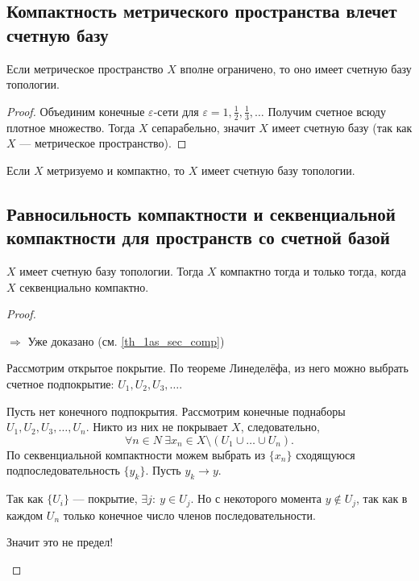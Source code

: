 \documentclass[11pt]{book}
\theoremstyle{definition}
\theoremstyle{plain}
\theoremstyle{plain}
\theoremstyle{definition}
\theoremstyle{remark}
\begin{document}
\subsection{Компактность метрического пространства влечет счетную базу}
\begin{thm}
    Если метрическое пространство $ X$ вполне ограничено, то оно имеет счетную базу топологии.
\end{thm}
\begin{proof}
    Объединим конечные $ \varepsilon $-сети для  $ \varepsilon = 1, \frac{1}{2}, \frac{1}{3}, \ldots $
    Получим счетное всюду плотное множество. Тогда  $ X$ сепарабельно, значит  $ X$ имеет счетную базу (так как  $ X$ --- метрическое пространство).
\end{proof}
\begin{thm}
    Если $ X$ метризуемо и компактно, то  $ X$ имеет счетную базу топологии.
\end{thm}
\subsection{Равносильность компактности и секвенциальной компактности для пространств со счетной базой}
\begin{thm}
    $ X$ имеет счетную базу топологии. Тогда   $ X$ компактно  тогда и только тогда, когда $ X$ секвенциально компактно.
\end{thm}
\begin{proof}
    $ $
    \begin{description}
	\item $\boxed{ \Longrightarrow }$  Уже доказано (см. \ref{th_1as_sec_comp})
	\item \boxed{ \Longleftarrow } Рассмотрим открытое покрытие. По теореме Линеделёфа, из него можно выбрать счетное подпокрытие: $ U_1, U_2, U_3, \ldots $.

	    Пусть нет конечного подпокрытия.
	    Рассмотрим конечные поднаборы $ U_1, U_2, U_3, \ldots , U_n$. Никто из них не покрывает $ X$, следовательно,
	    \[
		\forall n \in N~ \exists x_n \in X \setminus (U_1 \cup \ldots \cup U_n)
	    .\]
	    По секвенциальной компактности можем выбрать из $ \{x_{n}\}$ сходящуюся подпоследовательность $ \{y_k\}$. Пусть $ y_k \to  y$.

	    Так как $ \{U_i\}$ --- покрытие, $ \exists j: ~ y \in U_j $. Но с некоторого момента $ y \not\in U_j$, так как в каждом $ U_n$ только конечное число членов последовательности.

	    Значит это не предел!
    \end{description}
\end{proof}
\end{document}
